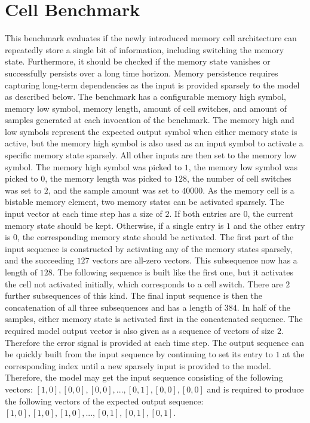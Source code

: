 \documentclass[draft,final]{vutinfth} %
\begin{document}
    \section{Cell Benchmark} \label{cell}
    This benchmark evaluates if the newly introduced memory cell architecture can repeatedly store a single bit of information, including switching the memory state.
    Furthermore, it should be checked if the memory state vanishes or successfully persists over a long time horizon.
    Memory persistence requires capturing long-term dependencies as the input is provided sparsely to the model as described below.
    The benchmark has a configurable memory high symbol, memory low symbol, memory length, amount of cell switches, and amount of samples generated at each invocation of the benchmark.
    The memory high and low symbols represent the expected output symbol when either memory state is active, but the memory high symbol is also used as an input symbol to activate a specific memory state sparsely. All other inputs are then set to the memory low symbol.
    The memory high symbol was picked to $1$, the memory low symbol was picked to $0$, the memory length was picked to $128$, the number of cell switches was set to $2$, and the sample amount was set to $40000$.
    As the memory cell is a bistable memory element, two memory states can be activated sparsely.
    The input vector at each time step has a size of $2$. If both entries are $0$, the current memory state should be kept.
    Otherwise, if a single entry is $1$ and the other entry is $0$, the corresponding memory state should be activated.
    The first part of the input sequence is constructed by activating any of the memory states sparsely, and the succeeding $127$ vectors are all-zero vectors.
    This subsequence now has a length of $128$. The following sequence is built like the first one, but it activates the cell not activated initially, which corresponds to a cell switch.
    There are $2$ further subsequences of this kind. The final input sequence is then the concatenation of all three subsequences and has a length of $384$.
    In half of the samples, either memory state is activated first in the concatenated sequence.
    The required model output vector is also given as a sequence of vectors of size $2$. Therefore the error signal is provided at each time step.
    The output sequence can be quickly built from the input sequence by continuing to set its entry to $1$ at the corresponding index until a new sparsely input is provided to the model.
    Therefore, the model may get the input sequence consisting of the following vectors: $[1,0],[0,0],[0,0],...,[0,1],[0,0],[0,0]$ and is required to produce the following vectors of the expected output sequence: $[1,0],[1,0],[1,0],...,[0,1],[0,1],[0,1]$.
\end{document}
